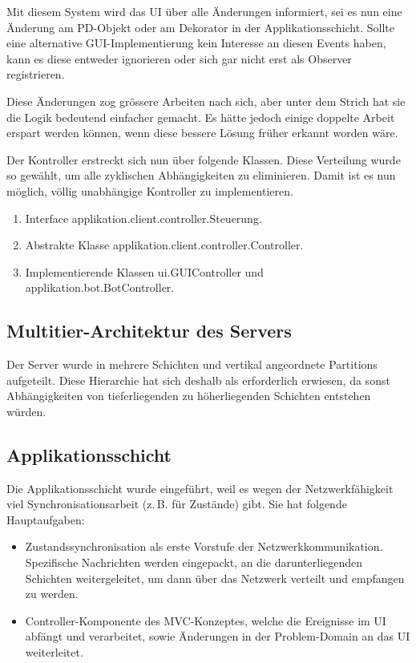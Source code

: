 \documentclass[12pt,halfparskip]{scrartcl}
\begin{document}
Mit diesem System wird das UI über alle Änderungen informiert, sei es nun eine Änderung am PD-Objekt oder am Dekorator in der Applikationsschicht. Sollte eine alternative GUI-Implementierung kein Interesse an diesen Events haben, kann es diese entweder ignorieren oder sich gar nicht erst als Observer registrieren.

Diese Änderungen zog grössere Arbeiten nach sich, aber unter dem Strich hat sie die Logik bedeutend einfacher gemacht. Es hätte jedoch einige doppelte Arbeit erspart werden können, wenn diese bessere Lösung früher erkannt worden wäre.

Der Kontroller erstreckt sich nun über folgende Klassen. Diese Verteilung wurde so gewählt, um alle zyklischen Abhängigkeiten zu eliminieren. Damit ist es nun möglich, völlig unabhängige Kontroller zu implementieren.
\begin{enumerate}
	\item Interface applikation.client.controller.Steuerung.
	\item Abstrakte Klasse applikation.client.controller.Controller.
	\item Implementierende Klassen ui.GUIController und applikation.bot.BotController.
\end{enumerate}

\subsection{Multitier-Architektur des Servers}
Der Server wurde in mehrere Schichten und vertikal angeordnete Partitions aufgeteilt. Diese Hierarchie hat sich deshalb als erforderlich erwiesen, da sonst Abhängigkeiten von tieferliegenden zu höherliegenden Schichten entstehen würden.

\subsection{Applikationsschicht}
Die Applikationsschicht wurde eingeführt, weil es wegen der Netzwerkfähigkeit viel Synchronisationsarbeit (z.\,B. für Zustände) gibt. Sie hat folgende Hauptaufgaben:
	\begin{itemize}
		\item Zustandssynchronisation als erste Vorstufe der Netzwerkkommunikation. Spezifische Nachrichten werden eingepackt, an die darunterliegenden Schichten weitergeleitet, um dann über das Netzwerk verteilt und empfangen zu werden.
		\item Controller-Komponente des MVC-Konzeptes, welche die Ereignisse im UI abfängt und verarbeitet, sowie Änderungen in der Problem-Domain an das UI weiterleitet.
	\end{itemize}
\end{document}
